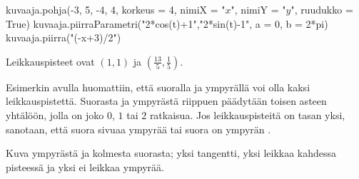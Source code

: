 \begin{esimerkki}
\begin{esimratk}
\begin{kuva}
    kuvaaja.pohja(-3, 5, -4, 4, korkeus = 4, nimiX = "$x$", nimiY = "$y$", ruudukko = True)
    kuvaaja.piirraParametri("2*cos(t)+1","2*sin(t)-1", a = 0, b = 2*pi)
    kuvaaja.piirra("(-x+3)/2")
	
\end{kuva}
\begin{esimvast}
Leikkauspisteet ovat $(1, 1)$ ja $(\frac{13}{5}, \frac{1}{5})$.
\end{esimvast}

\end{esimratk}
\end{esimerkki}

Esimerkin avulla huomattiin, että suoralla ja ympyrällä voi olla kaksi leikkauspistettä. Suorasta ja ympyrästä riippuen päädytään toisen asteen yhtälöön, jolla on joko $0$, $1$ tai $2$ ratkaisua. Jos leikkauspisteitä on tasan yksi, sanotaan, että suora sivuaa ympyrää tai suora on ympyrän .

Kuva ympyrästä ja kolmesta suorasta; yksi tangentti, yksi leikkaa kahdessa pisteessä ja yksi ei leikkaa ympyrää.


